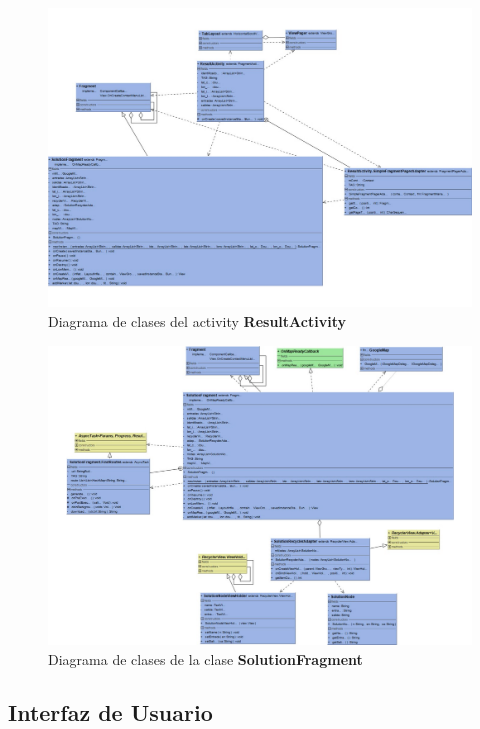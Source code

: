 \begin{figure}[H]
	\centering
	\includegraphics[scale=0.8,angle=90]{imagenes/result_activity.pdf}
	\caption{Diagrama de clases del activity \textbf{ResultActivity}}
	\label{fig:result_activity_diagram}
\end{figure}
\begin{figure}[H]
	\centering
	\includegraphics[scale=0.8,angle=90]{imagenes/result_fragment.pdf}
	\caption{Diagrama de clases de la clase \textbf{SolutionFragment}}
	\label{fig:solution_recycler_diagram}
\end{figure}


\subsection[Interfaz de Usuario]{Interfaz de Usuario}

